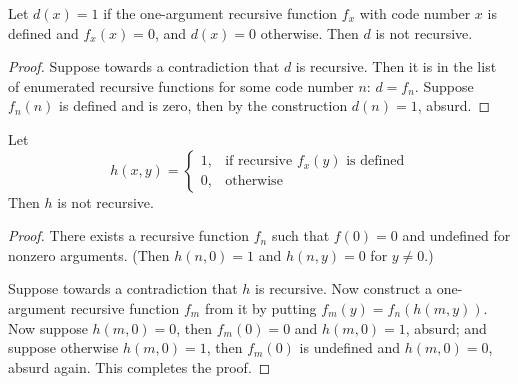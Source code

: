 \begin{exercise}[6.8]
  Let $d(x)=1$ if the one-argument recursive function $f_x$ with code number $x$ is defined and $f_x(x)=0$, and $d(x)=0$ otherwise.
  Then $d$ is not recursive.
\end{exercise}
\begin{proof}
  Suppose towards a contradiction that $d$ is recursive.
  Then it is in the list of enumerated recursive functions for some code number $n$: $d = f_n$.
  Suppose $f_n(n)$ is defined and is zero, then by the construction $d(n)=1$, absurd.
\end{proof}

\begin{exercise}[6.9]
  Let
  \begin{equation*}
    h(x,y) = \begin{cases}
      1, &\text{if recursive $f_x(y)$ is defined}\\
      0, &\text{otherwise}
    \end{cases}
  \end{equation*}
  Then $h$ is not recursive.
\end{exercise}
\begin{proof}
  \newcommand{\const}{\operatorname{const}}
  There exists a recursive function $f_n$ such that $f(0)=0$ and undefined for nonzero arguments.
  (Then $h(n,0)=1$ and $h(n,y)=0$ for $y\ne 0$.)
  
  Suppose towards a contradiction that $h$ is recursive.
  Now construct a one-argument recursive function $f_m$ from it by putting $f_m(y) = f_n(h(m, y))$.
  Now suppose $h(m,0)=0$, then $f_m(0)=0$ and $h(m,0)=1$, absurd; and suppose otherwise $h(m,0)=1$, then $f_m(0)$ is undefined and $h(m,0)=0$, absurd again. This completes the proof.
\end{proof}
